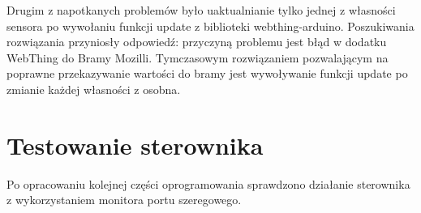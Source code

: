 \documentclass[11pt]{report}
\begin{document}
 Drugim z napotkanych problemów było uaktualnianie tylko jednej z własności sensora po wywołaniu funkcji update z biblioteki webthing-arduino. Poszukiwania rozwiązania przyniosły odpowiedź: przyczyną problemu jest błąd w dodatku WebThing do Bramy Mozilli. Tymczasowym rozwiązaniem pozwalającym na poprawne przekazywanie wartości do bramy jest wywoływanie funkcji update po zmianie każdej własności z osobna.

 \section{Testowanie sterownika}
 Po opracowaniu kolejnej części oprogramowania sprawdzono działanie sterownika z wykorzystaniem monitora portu szeregowego.

 
 
 
 
\end{document}
